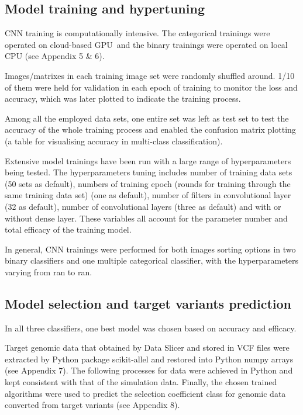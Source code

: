 \documentclass[a4paper,12pt,oneside]{extarticle}
\begin{document}
\subsection{Model training and hypertuning}
CNN training is computationally intensive. The categorical trainings were operated on cloud-based GPU and the binary trainings were operated on local CPU (see Appendix 5 \& 6).
\par
Images/matrixes in each training image set were randomly shuffled around. 1/10 of them were held for validation in each epoch of training to monitor the loss and accuracy, which was later plotted to indicate the training process. 
\par
Among all the employed data sets, one entire set was left as test set to test the accuracy of the whole training process and enabled the confusion matrix plotting (a table for visualising accuracy in multi-class classification).
\par
Extensive model trainings have been run with a large range of hyperparameters being tested. The hyperparameters tuning includes number of training data sets (50 sets as default), numbers of training epoch (rounds for training through the same training data set) (one as default), number of filters in convolutional layer (32 as default), number of convolutional layers (three as default) and with or without dense layer. These variables all account for the parameter number and total efficacy of the training model.
\par
In general, CNN trainings were performed for both images sorting options in two binary classifiers and one multiple categorical classifier, with the hyperparameters varying from ran to ran.


\subsection{Model selection and target variants prediction}
In all three classifiers, one best model was chosen based on accuracy and efficacy.
\par
Target genomic data that obtained by Data Slicer and stored in VCF files were extracted by Python package scikit-allel \cite{45} and restored into Python numpy arrays (see Appendix 7). The following processes for data were achieved in Python  and kept consistent with that of the simulation data. Finally, the chosen trained algorithms were used to predict the selection coefficient class for genomic data converted from target variants (see Appendix 8).
\end{document}
